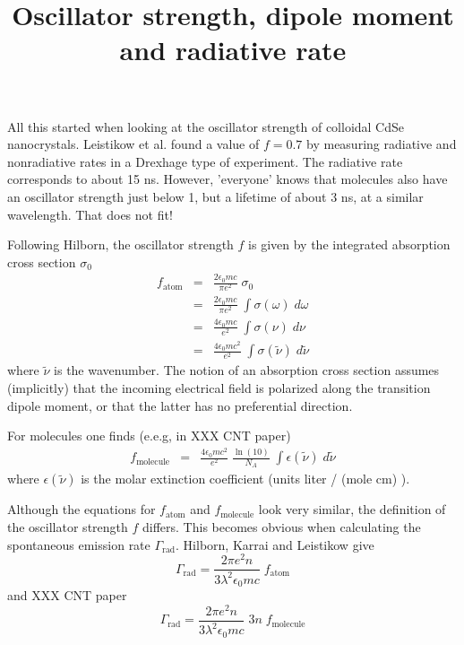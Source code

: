 \documentclass[a4paper,10pt]{article}
\title{Oscillator strength, dipole moment and radiative rate}
\author{}
\begin{document}
\maketitle

All this started when looking at the oscillator strength of colloidal CdSe nanocrystals. Leistikow et al. found
a value of $f = 0.7$ by measuring radiative and nonradiative rates in a Drexhage type of experiment. The radiative
rate corresponds to about 15 ns. However, 'everyone' knows that molecules  also have an oscillator strength
just below 1, but a lifetime of about 3 ns, at a similar wavelength. That does not fit!

Following Hilborn, the oscillator strength $f$ is given by the integrated
absorption cross section $\sigma_0$ 
\begin{eqnarray}
 f_{\text{atom}} &= &  \frac{2 \epsilon_0 m c}{\pi e^2} \; \sigma_0 \\
   & = & \frac{2 \epsilon_0 m c}{\pi e^2} \; \int \sigma(\omega) \; d\omega \\
   & = & \frac{4 \epsilon_0 m c}{ e^2} \; \int \sigma(\nu) \; d\nu \\
   & = & \frac{4 \epsilon_0 m c^2}{ e^2} \; \int \sigma(\tilde{\nu}) \;
d\tilde{\nu} 
\end{eqnarray}
where $\tilde{\nu}$ is the wavenumber. The notion of an absorption cross section
assumes (implicitly) 
that the incoming electrical field is
polarized along the transition dipole moment, or that the latter has no
preferential direction.

For molecules one finds (e.e.g, in XXX CNT paper)
\begin{eqnarray}
 f_{\text{molecule}} &= &  \frac{4 \epsilon_0 m c^2}{e^2} \; 
\frac{\ln(10)}{N_A} \; \int \epsilon(\tilde{\nu}) \; d\tilde{\nu} 
\end{eqnarray}
where $\epsilon(\tilde{\nu})$ is the molar extinction coefficient (units liter /
(mole cm) ). 

Although the equations for $f_{\text{atom}}$ and  $f_{\text{molecule}}$ look
very similar, the definition of 
the oscillator strength $f$ differs. This becomes obvious when calculating the 
spontaneous emission rate $\Gamma_{\text{rad}}$. Hilborn, Karrai  and Leistikow give
\begin{equation}
 \Gamma_{\text{rad}} = \frac{2 \pi e^2 n}{3 \lambda^2 \epsilon_0  m c} \;
f_{\text{atom}} 
\end{equation}
and XXX CNT paper
\begin{equation}
 \Gamma_{\text{rad}} = \frac{2 \pi e^2 n}{3 \lambda^2 \epsilon_0  m c} \; 3 n 
\; f_{\text{molecule}} 
\end{equation}
\end{document}
